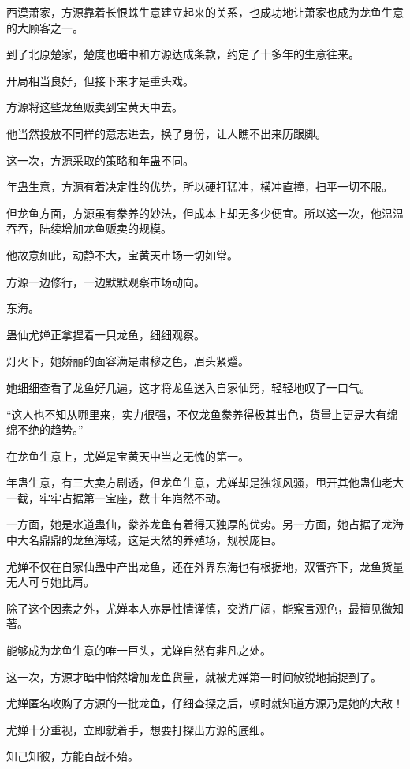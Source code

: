 \begin{this_body}
西漠萧家，方源靠着长恨蛛生意建立起来的关系，也成功地让萧家也成为龙鱼生意的大顾客之一。

到了北原楚家，楚度也暗中和方源达成条款，约定了十多年的生意往来。

开局相当良好，但接下来才是重头戏。

方源将这些龙鱼贩卖到宝黄天中去。

他当然投放不同样的意志进去，换了身份，让人瞧不出来历跟脚。

这一次，方源采取的策略和年蛊不同。

年蛊生意，方源有着决定性的优势，所以硬打猛冲，横冲直撞，扫平一切不服。

但龙鱼方面，方源虽有豢养的妙法，但成本上却无多少便宜。所以这一次，他温温吞吞，陆续增加龙鱼贩卖的规模。

他故意如此，动静不大，宝黄天市场一切如常。

方源一边修行，一边默默观察市场动向。

东海。

蛊仙尤婵正拿捏着一只龙鱼，细细观察。

灯火下，她娇丽的面容满是肃穆之色，眉头紧蹙。

她细细查看了龙鱼好几遍，这才将龙鱼送入自家仙窍，轻轻地叹了一口气。

“这人也不知从哪里来，实力很强，不仅龙鱼豢养得极其出色，货量上更是大有绵绵不绝的趋势。”

在龙鱼生意上，尤婵是宝黄天中当之无愧的第一。

年蛊生意，有三大卖方剧透，但龙鱼生意，尤婵却是独领风骚，甩开其他蛊仙老大一截，牢牢占据第一宝座，数十年岿然不动。

一方面，她是水道蛊仙，豢养龙鱼有着得天独厚的优势。另一方面，她占据了龙海中大名鼎鼎的龙鱼海域，这是天然的养殖场，规模庞巨。

尤婵不仅在自家仙蛊中产出龙鱼，还在外界东海也有根据地，双管齐下，龙鱼货量无人可与她比肩。

除了这个因素之外，尤婵本人亦是性情谨慎，交游广阔，能察言观色，最擅见微知著。

能够成为龙鱼生意的唯一巨头，尤婵自然有非凡之处。

这一次，方源才暗中悄然增加龙鱼货量，就被尤婵第一时间敏锐地捕捉到了。

尤婵匿名收购了方源的一批龙鱼，仔细查探之后，顿时就知道方源乃是她的大敌！

尤婵十分重视，立即就着手，想要打探出方源的底细。

知己知彼，方能百战不殆。


\end{this_body}
